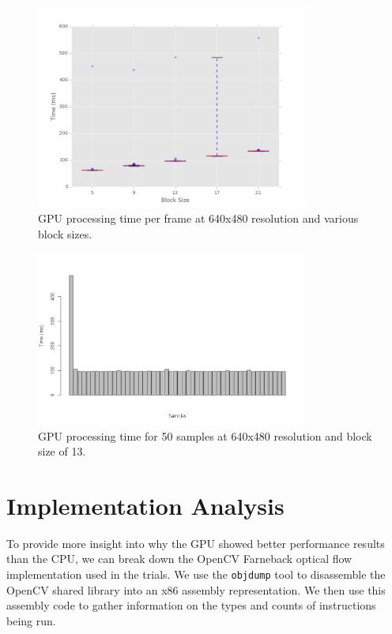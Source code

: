 \documentclass[12pt,letterpaper]{article}
\begin{document}
\begin{figure}[H]
  \centering
    \includegraphics[width=0.8\textwidth]{img/gpu_blocksize.png}
  \caption{GPU processing time per frame at 640x480 resolution and various block sizes.}
  \label{fig:gpublock}
\end{figure}

\begin{figure}[H]
  \centering
    \includegraphics[width=0.8\textwidth]{img/cudaloading.png}
  \caption{GPU processing time for 50 samples at 640x480 resolution and block size of 13.}
  \label{fig:cudaload}
\end{figure}

\section{Implementation Analysis}
To provide more insight into why the GPU showed better performance results than
the CPU, we can break down the OpenCV Farneback optical flow implementation
used in the trials. We use the \texttt{objdump} tool to disassemble the OpenCV
shared library into an x86 assembly representation. We then use this assembly
code to gather information on the types and counts of instructions being run.
\end{document}
